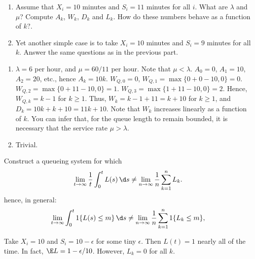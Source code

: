 \begin{question}\label{ex:2}
  \begin{enumerate}
  \item Assume that $X_i = 10$ minutes and $S_i = 11$ minutes for all
    $i$. What are $\lambda$ and $\mu$?  Compute $A_k$, $W_k$, $D_k$
    and $L_k$. How do these numbers behave as a function of $k$?.
  \item Yet another simple case is to take $X_i=10$ minutes and
    $S_i=9$ minutes for all $k$. Answer the same questions as in the
    previous part.
  \end{enumerate}
  \begin{solution}
    \begin{enumerate}
    \item $\lambda=6$ per hour, and $\mu=60/11$ per hour. Note that
      $\mu < \lambda$. $A_0 = 0$, $A_1=10$, $A_2=20$, etc., hence
      $A_k = 10k$. $W_{Q,0} = 0$, $W_{Q,1} = \max\{0 + 0-10,0\} = 0$.
      $W_{Q,2} = \max\{0+11-10,0\} =1$.
      $W_{Q,3} = \max\{1+11-10,0\} =2$. Hence, $W_{Q,k} = k-1$ for
      $k\geq1$. Thus, $W_k = k-1+11 = k + 10$ for $k\geq1$, and
      $D_k = 10k + k+10 = 11k+10$. Note that $W_k$ increases linearly
      as a function of $k$.  You can infer that, for the queue length
      to remain bounded, it is necessary that the service rate
      $\mu > \lambda$.
    \item Trivial.
    \end{enumerate}
  \end{solution}
\end{question}




\begin{question}\label{ex:4}
  Construct a queueing system for which 
\begin{equation*}
  \lim_{t\to\infty} \frac 1 t\int_0^t L(s)\, \d s \neq   \lim_{n\to\infty}\frac 1n  \sum_{k=1}^n L_k.
\end{equation*}
hence, in general:
  \begin{equation*}
    \lim_{t\to\infty} \int_0^t 1\{L(s)\leq m\}\,\d s \neq \lim_{n\to\infty} \frac 1n \sum_{k=1}^n 1\{L_k \leq m\},
  \end{equation*}
\begin{solution}
  Take $X_i = 10$ and $S_i = 10-\epsilon$ for some tiny
  $\epsilon$. Then $L(t) = 1$ nearly all of the time. In fact,
  $\E L = 1-\epsilon/10$. However, $L_k=0$ for all $k$.
\end{solution}
\end{question}


